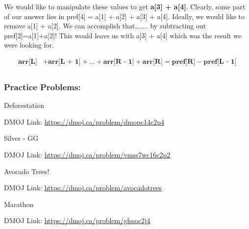 \documentclass{report}
\newcommand{\problem}[2]{
    \begin{problembox}
        #1
        
        DMOJ Link: \href{#2}{#2}
    \end{problembox}
}
\begin{document}
We would like to manipulate these values to get \textbf{a[3] + a[4]}. Clearly, some part of our answer lies in pref[4] = a[1] + a[2] + a[3] + a[4]. Ideally, we would like to remove a[1] + a[2]. We can accomplish that…….. by subtracting out pref[2]=a[1]+a[2]! This would leave us with a[3] + a[4] which was the result we were looking for.

\begin{align*}
    \textbf{arr[L]} &+ \textbf{arr[L + 1]} + ... + \textbf{arr[R - 1]} + \textbf{arr[R]} = \textbf{pref[R]} - \textbf{pref[L - 1]} \\
\end{align*}

\subsubsection{Practice Problems: }
\problem{Deforestation}{https://dmoj.ca/problem/dmopc14c2p4}
\problem{Silver - GG}{https://dmoj.ca/problem/vmss7wc16c2p2}
\problem{Avocado Trees!}{https://dmoj.ca/problem/avocadotrees}
\problem{Marathon}{https://dmoj.ca/problem/gfssoc2j4}




% 
% 

\end{document}
